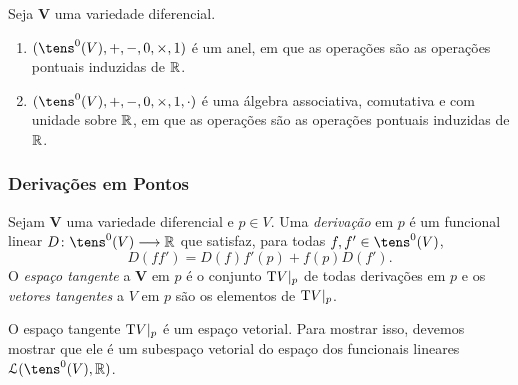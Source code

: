 \begin{prop}
Seja $\bm V$ uma variedade diferencial.
	\begin{enumerate}
	\item $(\tens^0(V),+,-,0,\times,1)$ é um anel, em que as operações são as operações pontuais induzidas de $\mathbb{R}$.
	\item $(\tens^0(V),+,-,0,\times,1,\cdot)$ é uma álgebra associativa, comutativa e com unidade sobre $\mathbb{R}$, em que as operações são as operações pontuais induzidas de $\mathbb{R}$.
	\end{enumerate}
\end{prop}

\subsubsection{Derivações em Pontos}

\begin{defi}
Sejam $\bm V$ uma variedade diferencial e $p \in V$. Uma \emph{derivação} em $p$ é um funcional linear $D\colon \tens^0(V) \to \R$ que satisfaz, para todas $f,f' \in \tens^0(V)$,
	\begin{equation*}
	D(ff') = D(f)f'(p) + f(p)D(f').
	\end{equation*}
O \emph{espaço tangente} a $\bm V$ em $p$ é o conjunto $\mathrm{T} V|_p$ de todas derivações em $p$ e os \emph{vetores tangentes} a $V$ em $p$ são os elementos de $\mathrm{T} V|_p$.
\end{defi}

O espaço tangente $\mathrm{T} V|_p$ é um espaço vetorial. Para mostrar isso, devemos mostrar que ele é um subespaço vetorial do espaço dos funcionais lineares $\lin(\tens^0(V),\R)$.

